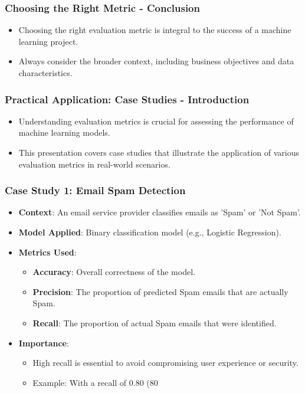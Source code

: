 \documentclass[aspectratio=169]{beamer}
\begin{document}
\begin{frame}[fragile]
    \frametitle{Choosing the Right Metric - Conclusion}
    \begin{itemize}
        \item Choosing the right evaluation metric is integral to the success of a machine learning project.
        \item Always consider the broader context, including business objectives and data characteristics.
    \end{itemize}
\end{frame}

\begin{frame}[fragile]
    \frametitle{Practical Application: Case Studies - Introduction}
    \begin{itemize}
        \item Understanding evaluation metrics is crucial for assessing the performance of machine learning models.
        \item This presentation covers case studies that illustrate the application of various evaluation metrics in real-world scenarios.
    \end{itemize}
\end{frame}

\begin{frame}[fragile]
    \frametitle{Case Study 1: Email Spam Detection}
    \begin{itemize}
        \item \textbf{Context}: An email service provider classifies emails as 'Spam' or 'Not Spam'.
        \item \textbf{Model Applied}: Binary classification model (e.g., Logistic Regression).
        \item \textbf{Metrics Used}:
            \begin{itemize}
                \item \textbf{Accuracy}: Overall correctness of the model.
                \item \textbf{Precision}: The proportion of predicted Spam emails that are actually Spam.
                \item \textbf{Recall}: The proportion of actual Spam emails that were identified.
            \end{itemize}
        \item \textbf{Importance}:
            \begin{itemize}
                \item High recall is essential to avoid compromising user experience or security.
                \item Example: With a recall of 0.80 (80%
            \end{itemize}
    \end{itemize}
\end{frame}
\end{document}
